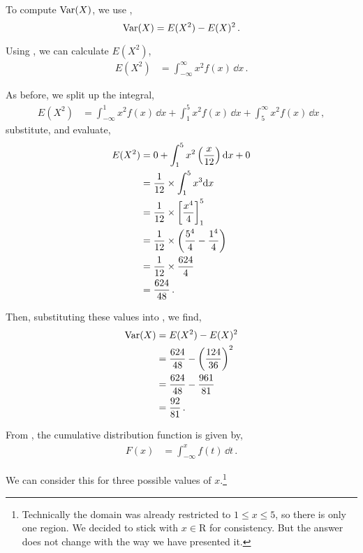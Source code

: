 \begin{subquestions}
To compute $\text{Var}(X)$, we use ,
\begin{equation}
	\text{Var}(X) = E(X^2) - E(X)^2 \,.\label{2008M:q4:CRVar}
\end{equation}

Using , we can calculate $E(X^2)$,
\begin{align}
	E(X^2) & = \int_{-\infty}^{\infty} x^2f(x)\,\dd x \,.
\end{align}

As before, we split up the integral,
\begin{align}
	E(X^2)& = \int_{-\infty}^{1} x^2f(x)\,\dd x+\int_{1}^{5} x^2f(x)\,\dd x+\int_{5}^{\infty} x^2f(x)\,\dd x \,,
\end{align}
substitute, and evaluate,
\begin{align}
	E(X^2) & = 0 + \int_{1}^{5} x^2\left( \frac{x}{12}\right)\mathrm{d}x + 0 \nonumber \\
	& = \frac{1}{12} \times \int_{1}^{5} x^3\mathrm{d}x \nonumber \\ 
	& = \frac{1}{12} \times \left[\frac{x^4}{4}\right]^5_1 \nonumber \\
	& = \frac{1}{12} \times \left(\frac{5^4}{4}-\frac{1^4}{4}\right) \nonumber \\
	& = \frac{1}{12} \times \frac{624}{4} \nonumber \\
	& = \frac{624}{48} \,. 
\end{align}

Then, substituting these values into , we find,
\begin{align}
	\text{Var}(X) & = E(X^2) - E(X)^2 \nonumber \\
	& = \frac{624}{48} - \left(\frac{124}{36}\right)^2 \nonumber \\
	& = \frac{624}{48}-\frac{961}{81} \nonumber \\
	& = \frac{92}{81} \,.
\end{align}


\subquestion

From , the cumulative distribution function is given by,
\begin{align}
	F(x) & = \int_{-\infty}^{x} f(t)\, \dd t\,.
\end{align}

We can consider this for three possible values of $x$.\footnote{Technically the domain was already restricted to $1\leq x \leq 5$, so there is only one region. We decided to stick with $x\in \mathrm{R}$ for consistency. But the answer does not change with the way we have presented it.} 


\end{subquestions}

